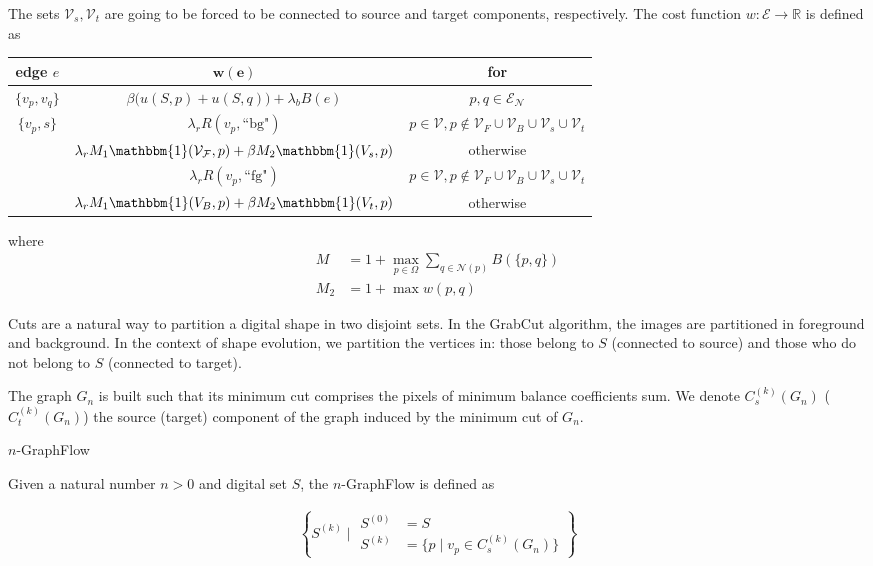 The sets $\mathcal{V}_s, \mathcal{V}_t$ are going to be forced to be connected to source and target components, respectively. The cost function $w:\mathcal{E}\rightarrow \mathbb{R}$ is defined as 

\begin{table}[H]
\centering
\setlength{\extrarowheight}{0.75em}
\begin{tabular}{|c|c|c|}
\hline
\textbf{edge} $e$ & $\mathbf{w(e)}$ & \textbf{for}\\
\hline
$\{v_p, v_q\}$ & $\beta \big(u(S,p) + u(S,q)\big) + \lambda_bB(e)$ & $p,q \in \mathcal{E}_{\mathcal{N}}$\\
\hline
\multirow{3}{*}{$\{v_p, s\}$} & $\lambda_r R(v_p,\text{``bg"})$ & $p \in \mathcal{\mathcal{V}}, p \notin \mathcal{\mathcal{V}}_F \cup \mathcal{\mathcal{V}}_B \cup \mathcal{\mathcal{V}}_s \cup \mathcal{\mathcal{V}}_t$\\
& $\lambda_r M_1\mathbbm{1}(\mathcal{V_F},p) + \beta M_2\mathbbm{1}(V_s,p)$ & otherwise \\
\hline
\multirow{3}{*}{$\{v_p, t\}$} & $\lambda_r R(v_p,\text{``fg"})$ & $p \in \mathcal{\mathcal{V}}, p \notin \mathcal{\mathcal{V}}_F \cup \mathcal{\mathcal{V}}_B \cup \mathcal{\mathcal{V}}_s \cup \mathcal{\mathcal{V}}_t$ \\
& $\lambda_r M_1\mathbbm{1}(V_B,p) + \beta M_2\mathbbm{1}(V_t,p)$ & otherwise \\
\hline
\end{tabular}
\end{table}

where
\begin{align*}
M &= 1 + \max_{p \in \Omega}{\sum_{q \in \mathcal{N}(p)}}{B(\{p,q\})} \\
M_2 &= 1 + \max w(p,q)
\end{align*}


Cuts are a natural way to partition a digital shape in two disjoint sets. In the GrabCut algorithm, the images are partitioned in foreground and background. In the context of shape evolution, we partition the vertices in: those belong to $S$ (connected to source) and those who do not belong to $S$ (connected to target).

The graph $G_n$ is built such that its minimum cut comprises the pixels of minimum balance coefficients sum. We denote $C_s^{(k)}(G_n)$ ($C_t^{(k)}(G_n)$) the source (target) component of the graph induced by the minimum cut of $G_n$. 
 

\begin{definition}{$n$-GraphFlow}

Given a natural number $n>0$ and digital set $S$, the $n$-GraphFlow is defined as

\begin{align*}
	\left \{ S^{(k)} \; | \; \begin{array}{ll}
	S^{(0)}&=S \\
	S^{(k)}&= \{ p \; | \; v_p \in C_s^{(k)}(G_n) \}
	\end{array} \right\}
\end{align*}

\end{definition}


